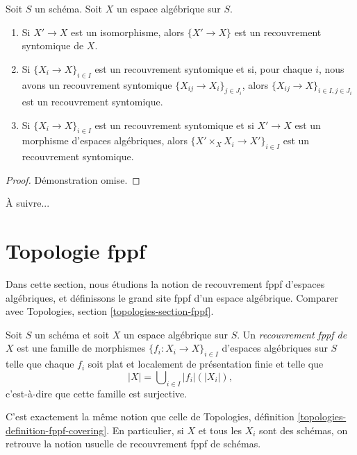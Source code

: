 \begin{lemma}
\label{lemma-syntomic}
Soit $S$ un schéma.
Soit $X$ un espace algébrique sur $S$.
\begin{enumerate}
\item Si $X' \to X$ est un isomorphisme, alors $\{X' \to X\}$
est un recouvrement syntomique de $X$.
\item Si $\{X_i \to X\}_{i\in I}$ est un recouvrement syntomique et si, pour chaque
$i$, nous avons un recouvrement syntomique $\{X_{ij} \to X_i\}_{j\in J_i}$, alors
$\{X_{ij} \to X\}_{i \in I, j\in J_i}$ est un recouvrement syntomique.
\item Si $\{X_i \to X\}_{i\in I}$ est un recouvrement syntomique
et si $X' \to X$ est un morphisme d'espaces algébriques, alors
$\{X' \times_X X_i \to X'\}_{i\in I}$ est un recouvrement syntomique.
\end{enumerate}
\end{lemma}

\begin{proof}
Démonstration omise.
\end{proof}

\noindent
À suivre...










\section{Topologie fppf}
\label{section-fppf}

\noindent
Dans cette section, nous étudions la notion de recouvrement fppf d'espaces algébriques,
et définissons le grand site fppf d'un espace algébrique. Comparer avec
Topologies, section \ref{topologies-section-fppf}.

\begin{definition}
\label{definition-fppf-covering}
Soit $S$ un schéma et soit $X$ un espace algébrique sur $S$.
Un {\it recouvrement fppf de $X$} est une famille de morphismes
$\{f_i : X_i \to X\}_{i \in I}$ d'espaces algébriques sur $S$
telle que chaque $f_i$ soit plat et localement de présentation finie
et telle que
$$
|X| = \bigcup\nolimits_{i \in I} |f_i|(|X_i|),
$$
c'est-à-dire que cette famille est surjective.
\end{definition}

\noindent
C'est exactement la même notion que celle de
Topologies, définition \ref{topologies-definition-fppf-covering}.
En particulier, si $X$ et tous les $X_i$ sont des schémas, on retrouve la notion usuelle
de recouvrement fppf de schémas.

